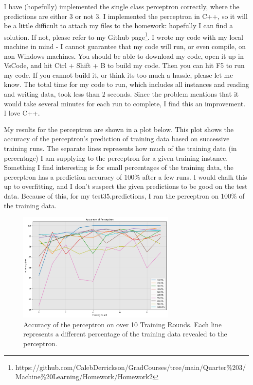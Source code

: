 \partbreak
\begin{solution}

    I have (hopefully) implemented the single class perceptron correctly, where the predictions are either 3 or not 3. I implemented the perceptron in C++, so it will be a little difficult to attach my files to the homework: hopefully I can find a solution. If not, please refer to my Github page\footnote{https://github.com/CalebDerrickson/GradCourses/tree/main/Quarter\%203/Machine\%20Learning/Homework/Homework2}. I wrote my code with my local machine in mind - I cannot guarantee that my code will run, or even compile, on non Windows machines. You should be able to download my code, open it up in VsCode, and hit Ctrl + Shift + B to build my code. Then you can hit F5 to run my code. If you cannot build it, or think its too much a hassle, please let me know. The total time for my code to run, which includes all instances and reading and writing data, took less than 2 seconds. Since the problem mentions that it would take several minutes for each run to complete, I find this an improvement. I love C++.

    \jump
    My results for the perceptron are shown in a plot below. This plot shows the accuracy of the perceptron's prediction of training data based on successive training runs. The separate lines represents how much of the training data (in percentage) I am supplying to the perceptron for a given training instance. Something I find interesting is for small percentages of the training data, the perceptron has a prediction accuracy of 100\% after a few runs. I would chalk this up to overfitting, and I don't suspect the given predictions to be good on the test data. Because of this, for my test35.predictions, I ran the perceptron on 100\% of the training data. 
\end{solution}

\begin{figure}
    \centering
    \includegraphics[width = 0.7\textwidth]{accuracy.png}
    \caption{Accuracy of the perceptron on over 10 Training Rounds. Each line represents a different percentage of the training data revealed to the perceptron. }
    \label{fig:accuracy}
\end{figure}
